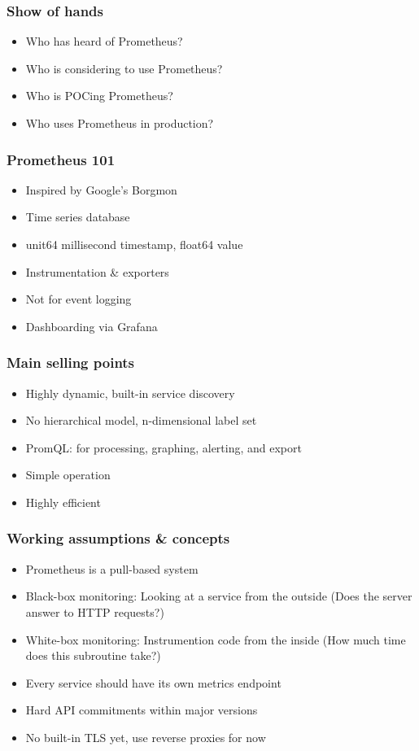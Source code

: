 \documentclass[t]{beamer}
\begin{document}


\begin{frame}
	\frametitle{Show of hands}
	\begin{itemize}
		\item Who has heard of Prometheus?
		\item Who is considering to use Prometheus?
		\item Who is POCing Prometheus?
		\item Who uses Prometheus in production?
	\end{itemize}
\end{frame}

\begin{frame}
	\frametitle{Prometheus 101}
	\begin{itemize}
		\item Inspired by Google's Borgmon
		\item Time series database
		\item unit64 millisecond timestamp, float64 value
		\item Instrumentation \& exporters
		\item Not for event logging
		\item Dashboarding via Grafana
	\end{itemize}
\end{frame}

\begin{frame}
	\frametitle{Main selling points}
	\begin{itemize}
		\item Highly dynamic, built-in service discovery
		\item No hierarchical model, n-dimensional label set
		\item PromQL: for processing, graphing, alerting, and export
		\item Simple operation
		\item Highly efficient
	\end{itemize}
\end{frame}

\begin{frame}
	\frametitle{Working assumptions \& concepts}
	\begin{itemize}
		\item Prometheus is a pull-based system
		\item Black-box monitoring: Looking at a service from the outside (Does the server answer to HTTP requests?)
		\item White-box monitoring: Instrumention code from the inside (How much time does this subroutine take?)
		\item Every service should have its own metrics endpoint
		\item Hard API commitments within major versions
		\item No built-in TLS yet, use reverse proxies for now
	\end{itemize}
\end{frame}
\end{document}
